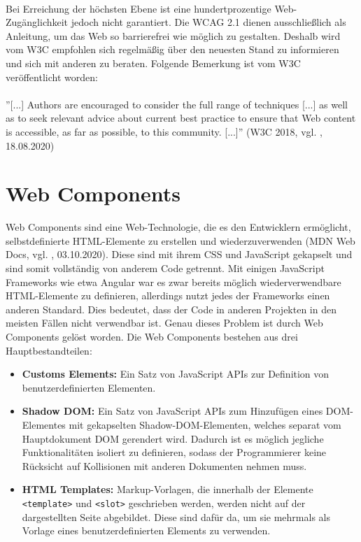 \mbox{}\\
Bei Erreichung der höchsten Ebene ist eine hundertprozentige Web-Zugänglichkeit jedoch nicht garantiert. Die WCAG 2.1 dienen ausschließlich als Anleitung, um das Web so barrierefrei wie möglich zu gestalten. Deshalb wird vom W3C empfohlen sich regelmäßig über den neuesten Stand zu informieren und sich mit anderen zu beraten. Folgende Bemerkung ist vom W3C veröffentlicht worden:\\

\mbox{}\\
''[...] Authors are encouraged to consider the full range of techniques [...] as well as to seek relevant advice about current best practice to ensure that Web content is accessible, as far as possible, to this community. [...]'' (W3C 2018, vgl. \cite{wcag_2_1_2018}, 18.08.2020)

\section{Web Components}
\label{web_comp}
Web Components sind eine Web-Technologie, die es den Entwicklern ermöglicht, selbstdefinierte HTML-Elemente zu erstellen und wiederzuverwenden (MDN Web Docs, vgl. \cite{moz_webcomp_2019}, 03.10.2020). Diese sind mit ihrem CSS und JavaScript gekapselt und sind somit vollständig von anderem Code getrennt. Mit einigen JavaScript Frameworks wie etwa Angular war es zwar bereits möglich wiederverwendbare HTML-Elemente zu definieren, allerdings nutzt jedes der Frameworks einen anderen Standard. Dies bedeutet, dass der Code in anderen Projekten in den meisten Fällen nicht verwendbar ist. Genau dieses Problem ist durch Web Components gelöst worden. Die Web Components bestehen aus drei Hauptbestandteilen:

\begin{itemize}
	\item \textbf{Customs Elements:} Ein Satz von JavaScript APIs zur Definition von benutzerdefinierten Elementen.
	\item \textbf{Shadow DOM:} Ein Satz von JavaScript APIs zum Hinzufügen eines DOM-Elementes mit gekapselten Shadow-DOM-Elementen, welches separat vom Hauptdokument DOM gerendert wird. Dadurch ist es möglich jegliche Funktionalitäten isoliert zu definieren, sodass der Programmierer keine Rücksicht auf Kollisionen mit anderen Dokumenten nehmen muss.
	\item \textbf{HTML Templates:} Markup-Vorlagen, die innerhalb der Elemente \texttt{<template>} und \texttt{<slot>} geschrieben werden, werden nicht auf der dargestellten Seite abgebildet. Diese sind dafür da, um sie mehrmals als Vorlage eines benutzerdefinierten Elements zu verwenden.
\end{itemize}

